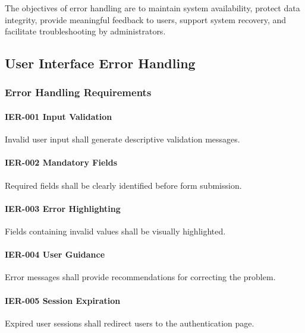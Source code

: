 The objectives of error handling are to maintain system availability,
protect data integrity, provide meaningful feedback to users, support
system recovery, and facilitate troubleshooting by administrators.


\subsection{User Interface Error Handling}

\subsubsection*{Error Handling Requirements}

\paragraph{IER-001 Input Validation}

Invalid user input shall generate descriptive validation messages.

\paragraph{IER-002 Mandatory Fields}

Required fields shall be clearly identified before form submission.

\paragraph{IER-003 Error Highlighting}

Fields containing invalid values shall be visually highlighted.

\paragraph{IER-004 User Guidance}

Error messages shall provide recommendations for correcting the problem.

\paragraph{IER-005 Session Expiration}

Expired user sessions shall redirect users to the authentication page.


